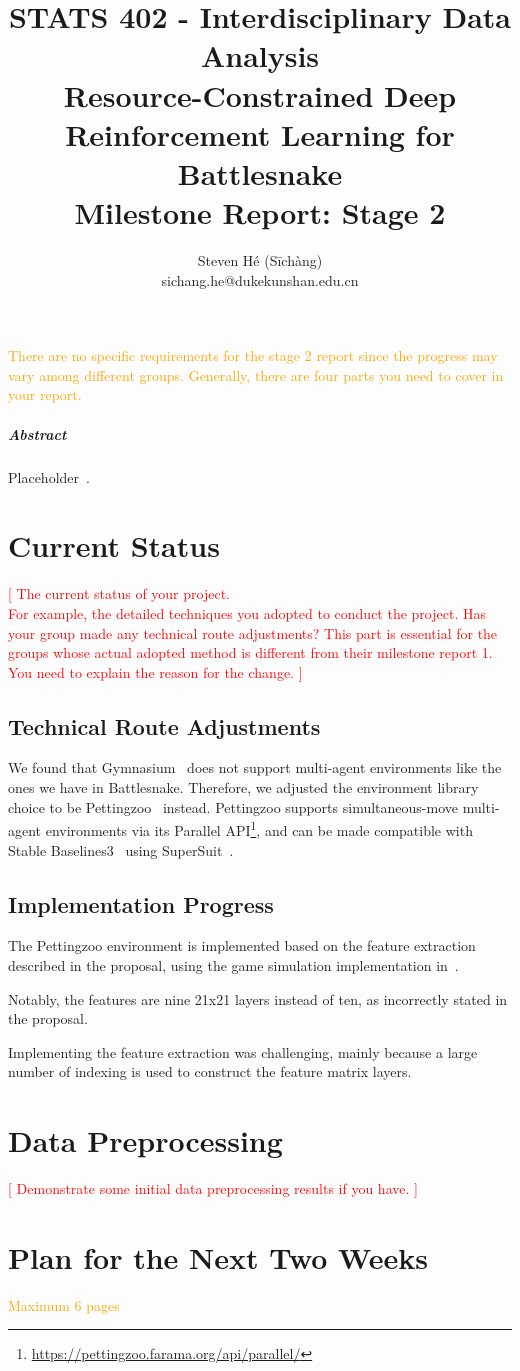 \documentclass[a4paper]{article}
\title{STATS 402 - Interdisciplinary Data Analysis\\
    Resource-Constrained Deep Reinforcement Learning for Battlesnake\\
    Milestone Report: Stage 2
}
\author{Steven Hé (Sīchàng)\\
    sichang.he@dukekunshan.edu.cn
}
\newcommand{\todo}[1]{\textcolor{red}{[ #1 ]}}
\newcommand{\instruction}[1]{\textcolor{orange}{#1}}
\begin{document}
\maketitle

\instruction{
    There are no specific requirements for the stage 2 report since the progress may vary among different groups. Generally, there are four parts you need to cover in your report.
}

\subparagraph{Abstract}

Placeholder~\cite{battlesnake}.

\section{Current Status}

\todo{The current status of your project.\\
    For example, the detailed techniques you adopted to conduct the project. Has your group made any technical route adjustments? This part is essential for the groups whose actual adopted method is different from their milestone report 1. You need to explain the reason for the change.
}

\subsection{Technical Route Adjustments}

We found that Gymnasium~\cite{farama2024gymnasium}
does not support multi-agent environments like the ones we have in Battlesnake.
Therefore,
we adjusted the environment library choice to be
Pettingzoo~\cite{terry2021pettingzoo} instead.
Pettingzoo supports simultaneous-move multi-agent environments via its Parallel
API\footnote{\url{https://pettingzoo.farama.org/api/parallel/}},
and can be made compatible with Stable Baselines3~\cite{raffin2024stable}
using SuperSuit~\cite{SuperSuit}.

\subsection{Implementation Progress}

The Pettingzoo environment is implemented based on the feature extraction
described in the proposal,
using the game simulation implementation in~\cite{wrenger2024rusty}.

Notably, the features are nine 21x21 layers instead of ten,
as incorrectly stated in the proposal.

Implementing the feature extraction was challenging,
mainly because a large number of indexing is used to construct the feature
matrix layers.

\section{Data Preprocessing}

\todo{Demonstrate some initial data preprocessing results if you have.}

\section{Plan for the Next Two Weeks}

\instruction{Maximum 6 pages}

\printbibliography
\end{document}
